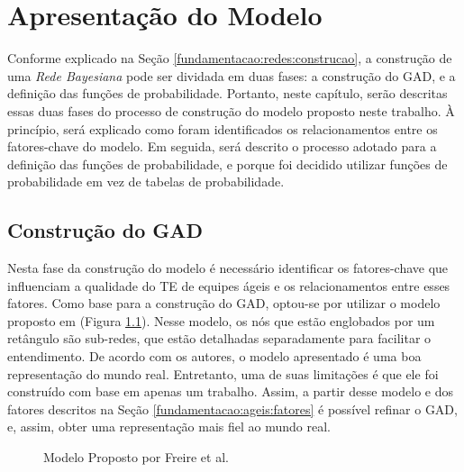 \chapter{Apresentação do Modelo}
\label{modelo}

Conforme explicado na Seção \ref{fundamentacao:redes:construcao}, a construção de uma \textit{Rede Bayesiana} pode ser dividada em duas fases: a construção do GAD, e a definição das funções de probabilidade. Portanto, neste capítulo, serão descritas essas duas fases do processo de construção do modelo proposto neste trabalho. À princípio, será explicado como foram identificados os relacionamentos entre os fatores-chave do modelo. Em seguida, será descrito o processo adotado para a definição das funções de probabilidade, e porque foi decidido utilizar funções de probabilidade em vez de tabelas de probabilidade.

\section{Construção do GAD}
\label{modelo:gad}

Nesta fase da construção do modelo é necessário identificar os fatores-chave que influenciam a qualidade do TE de equipes ágeis e os relacionamentos entre esses fatores. Como base para a construção do GAD, optou-se por utilizar o modelo proposto em \cite{freire} (Figura \ref{modelo:gad:freire}). Nesse modelo, os nós que estão englobados por um retângulo são sub-redes, que estão detalhadas separadamente para facilitar o entendimento. De acordo com os autores, o modelo apresentado é uma boa representação do mundo real. Entretanto, uma de suas limitações é que ele foi construído com base em apenas um trabalho. Assim, a partir desse modelo e dos fatores descritos na Seção \ref{fundamentacao:ageis:fatores} é possível refinar o GAD, e, assim, obter uma representação mais fiel ao mundo real.

\begin{figure}[h!]	
\begin{center}
	\end{center}
	\caption{Modelo Proposto por Freire et al.}
	\label{modelo:gad:freire}
\end{figure}

